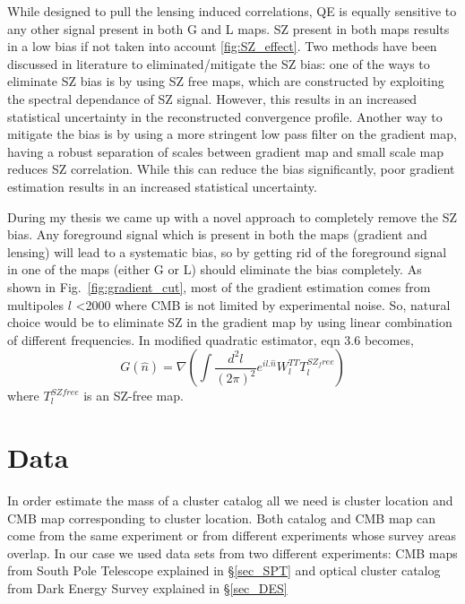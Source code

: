 While designed to pull the lensing induced correlations, QE is equally sensitive to any other signal present in both G and L maps.
 SZ present in both maps results in a low bias if not taken into account \ref{fig:SZ_effect}.
 Two methods have been discussed in literature to eliminated/mitigate the SZ bias:
 one of the ways to eliminate SZ bias is by using SZ free maps, which are constructed by exploiting the spectral dependance of SZ signal.
 However, this results in an increased statistical uncertainty in the reconstructed convergence profile.
 Another way to mitigate the bias is by using a more stringent low pass filter on the gradient map, having a robust separation of scales between gradient map and small scale map reduces SZ correlation.
 While this can reduce the bias significantly,  poor gradient estimation results in an increased statistical uncertainty.

 
 During my thesis we came up with a novel approach to completely remove the SZ bias. 
 Any foreground signal which is present in both the maps (gradient and lensing) will lead to a systematic bias, so by getting rid of the foreground signal in one of the maps (either G or L) should eliminate the bias completely.
  As shown in Fig.~\ref{fig:gradient_cut}, most of the gradient estimation comes from multipoles $l$ <2000 where CMB is not limited by experimental noise.
  So, natural choice would be to eliminate SZ in the gradient map by using linear combination of different frequencies. 
  In modified quadratic estimator, eqn 3.6 becomes,
  \begin{equation}
   G(\hat{n}) = \nabla (\int\frac{d^{2}l}{(2\pi)^{2}} e^{il .\hat{n}} W^{TT}_{l} T^{SZ_free}_{l}   )
  \end{equation}
  where $T^{SZ free}_{l} $ is an SZ-free map.
\section{Data}
\label{sec_data}
In order estimate the mass of a cluster catalog all we need is cluster location and CMB map corresponding to cluster location.
 Both catalog and CMB map can come from the same experiment or from different experiments whose survey areas overlap.
In our case we used data sets from two different experiments: CMB maps from South Pole Telescope explained in \S\ref{sec_SPT} and 
optical cluster catalog from Dark Energy Survey explained in \S\ref{sec_DES}

